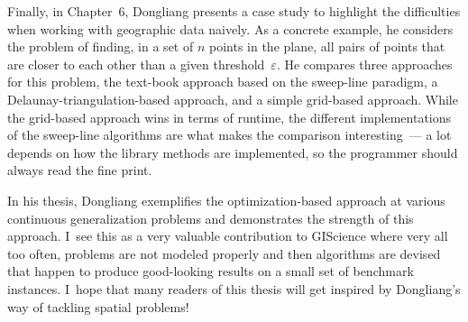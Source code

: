 {Finally, in Chapter~6, Dongliang presents a case study to highlight
the difficulties when working with geographic data naively.  As a
concrete example, he considers the problem of finding, in a set of
$n$ points in the plane, all pairs of points that are closer to each
other than a given threshold~$\varepsilon$.  He compares three
approaches for this problem, the text-book approach based on the
sweep-line paradigm, a Delaunay-triangulation-based approach, and a
simple grid-based approach.  While the grid-based approach wins in
terms of runtime, the different implementations of the sweep-line
algorithms are what makes the comparison interesting~--- a lot
depends on how the library methods are implemented, so the
programmer should always read the fine print.

In his thesis, Dongliang exemplifies the optimization-based approach
at various continuous generalization problems and demonstrates the
strength of this approach.  I~see this as a very valuable
contribution to GIScience where very all too often, problems are not
modeled properly and then algorithms are devised that happen to
produce good-looking results on a small set of benchmark instances.
I~hope that many readers of this thesis will get inspired by
Dongliang's way of tackling spatial problems!
	
}
